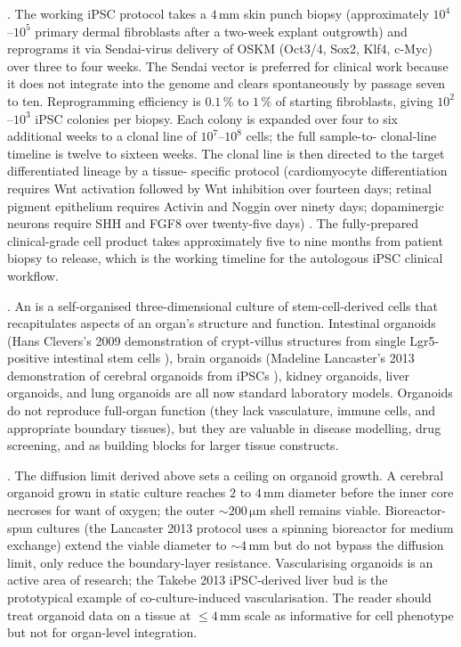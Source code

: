 

. The
working iPSC protocol takes a $4\,\text{mm}$ skin punch biopsy
(approximately $10^4$--$10^5$ primary dermal fibroblasts after a
two-week explant outgrowth) and reprograms it via Sendai-virus
delivery of OSKM (Oct3/4, Sox2, Klf4, c-Myc) over three to four
weeks. The Sendai vector is preferred for clinical work because it
does not integrate into the genome and clears spontaneously by
passage seven to ten. Reprogramming efficiency is $0.1\,\%$ to
$1\,\%$ of starting fibroblasts, giving $10^2$--$10^3$ iPSC colonies
per biopsy. Each colony is expanded over four to six additional
weeks to a clonal line of $10^7$--$10^8$ cells; the full sample-to-
clonal-line timeline is twelve to sixteen weeks. The clonal line is
then directed to the target differentiated lineage by a tissue-
specific protocol (cardiomyocyte differentiation requires Wnt
activation followed by Wnt inhibition over fourteen days; retinal
pigment epithelium requires Activin and Noggin over ninety days;
dopaminergic neurons require SHH and FGF8 over twenty-five days)
\cite{paper:v6c05-laflamme-cardiomyocyte-2007}. The fully-prepared
clinical-grade cell product takes approximately five to nine months
from patient biopsy to release, which is the working timeline for
the autologous iPSC clinical workflow.

. An  is a self-organised
three-dimensional culture of stem-cell-derived cells that
recapitulates aspects of an organ's structure and function.
Intestinal organoids (Hans Clevers's 2009 demonstration of
crypt-villus structures from single Lgr5-positive intestinal stem
cells \cite{paper:v6c05-clevers-organoids-2009}), brain organoids
(Madeline Lancaster's 2013 demonstration of cerebral organoids from
iPSCs \cite{paper:v6c05-lancaster-cerebral-2013}), kidney organoids,
liver organoids, and lung organoids are all now standard laboratory
models. Organoids do not reproduce full-organ function (they lack
vasculature, immune cells, and appropriate boundary tissues), but
they are valuable in disease modelling, drug screening, and as
building blocks for larger tissue constructs.

. The diffusion
limit derived above sets a ceiling on organoid growth. A cerebral
organoid grown in static culture reaches $2$ to $4\,\text{mm}$
diameter before the inner core necroses for want of oxygen; the
outer $\sim 200\,\si{\micro\meter}$ shell remains viable. Bioreactor-
spun cultures (the Lancaster 2013 protocol uses a spinning
bioreactor for medium exchange) extend the viable diameter to
$\sim 4\,\text{mm}$ but do not bypass the diffusion limit, only
reduce the boundary-layer resistance. Vascularising organoids is an
active area of research; the Takebe 2013 iPSC-derived liver bud
\cite{paper:v6c05-takebe-liver-2013} is the prototypical example of
co-culture-induced vascularisation. The reader should treat organoid
data on a tissue at $\le 4\,\text{mm}$ scale as informative for cell
phenotype but not for organ-level integration.

